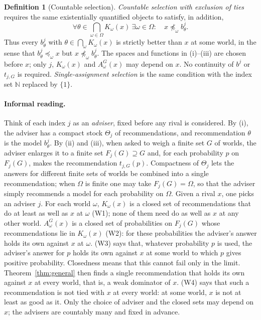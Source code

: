 \documentclass[11pt]{article}
\theoremstyle{definition}
\newtheorem{definition}[theorem]{Definition}
\theoremstyle{remark}
\begin{document}
\begin{definition}[Countable selection]
\emph{Countable selection with exclusion of ties} requires the same existentially quantified objects to satisfy, in addition,
\[
\forall\theta\in\bigcap_{\omega\in\Omega}K_\omega(x)\
\exists\omega\in\Omega:\quad x\not\preceq_\omega b^j_\theta.
\tag{W4}\label{eq:notie}
\]
Thus every $b^j_\theta$ with $\theta\in\bigcap_\omega K_\omega(x)$ is strictly better than $x$ at some world, in the sense that $b^j_\theta\preceq_\omega x$ but $x\not\preceq_\omega b^j_\theta$. The spaces and functions in (i)--(iii) are chosen before $x$; only $j$, $K_\omega(x)$ and $A^G_\omega(x)$ may depend on $x$. No continuity of $b^j$ or $t_{j,G}$ is required. \emph{Single-assignment selection} is the same condition with the index set $\mathbb N$ replaced by $\{1\}$.
\end{definition}

\paragraph{Informal reading.} Think of each index $j$ as an \emph{adviser}, fixed before any rival is considered. By (i), the adviser has a compact stock $\Theta_j$ of recommendations, and recommendation $\theta$ is the model $b^j_\theta$. By (ii) and (iii), when asked to weigh a finite set $G$ of worlds, the adviser enlarges it to a finite set $F_j(G)\supseteq G$ and, for each probability $p$ on $F_j(G)$, makes the recommendation $t_{j,G}(p)$. Compactness of $\Theta_j$ lets the answers for different finite sets of worlds be combined into a single recommendation; when $\Omega$ is finite one may take $F_j(G)=\Omega$, so that the adviser simply recommends a model for each probability on $\Omega$. Given a rival $x$, one picks an adviser $j$. For each world $\omega$, $K_\omega(x)$ is a closed set of recommendations that do at least as well as $x$ at $\omega$ (W1); none of them need do as well as $x$ at any other world. $A^G_\omega(x)$ is a closed set of probabilities on $F_j(G)$ whose recommendations lie in $K_\omega(x)$ (W2): for these probabilities the adviser's answer holds its own against $x$ at $\omega$. (W3) says that, whatever probability $p$ is used, the adviser's answer for $p$ holds its own against $x$ at some world to which $p$ gives positive probability. Closedness means that this cannot fail only in the limit. Theorem~\ref{thm:general} then finds a single recommendation that holds its own against $x$ at every world, that is, a weak dominator of $x$. (W4) says that such a recommendation is not tied with $x$ at every world: at some world, $x$ is not at least as good as it. Only the choice of adviser and the closed sets may depend on $x$; the advisers are countably many and fixed in advance.
\end{document}
